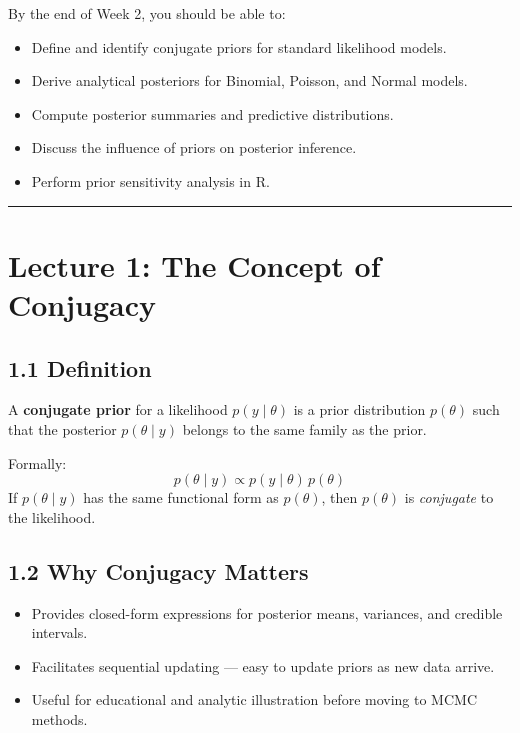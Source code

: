 \documentclass[
  letterpaper,
  DIV=11,
  numbers=noendperiod]{scrreprt}
\providecommand{\tightlist}{%
  \setlength{\itemsep}{0pt}\setlength{\parskip}{0pt}}
\begin{document}
By the end of Week 2, you should be able to:

\begin{itemize}
\tightlist
\item
  Define and identify conjugate priors for standard likelihood models.\\
\item
  Derive analytical posteriors for Binomial, Poisson, and Normal
  models.\\
\item
  Compute posterior summaries and predictive distributions.\\
\item
  Discuss the influence of priors on posterior inference.\\
\item
  Perform prior sensitivity analysis in R.
\end{itemize}

\begin{center}\rule{0.5\linewidth}{0.5pt}\end{center}

\section{Lecture 1: The Concept of
Conjugacy}\label{lecture-1-the-concept-of-conjugacy}

\subsection{1.1 Definition}\label{definition}

A \textbf{conjugate prior} for a likelihood \(p(y \mid \theta)\) is a
prior distribution \(p(\theta)\) such that the posterior
\(p(\theta \mid y)\) belongs to the same family as the prior.

Formally: \[
p(\theta \mid y) \propto p(y \mid \theta)\, p(\theta)
\] If \(p(\theta \mid y)\) has the same functional form as
\(p(\theta)\), then \(p(\theta)\) is \emph{conjugate} to the likelihood.

\subsection{1.2 Why Conjugacy Matters}\label{why-conjugacy-matters}

\begin{itemize}
\tightlist
\item
  Provides closed-form expressions for posterior means, variances, and
  credible intervals.\\
\item
  Facilitates sequential updating --- easy to update priors as new data
  arrive.\\
\item
  Useful for educational and analytic illustration before moving to MCMC
  methods.
\end{itemize}
\end{document}
